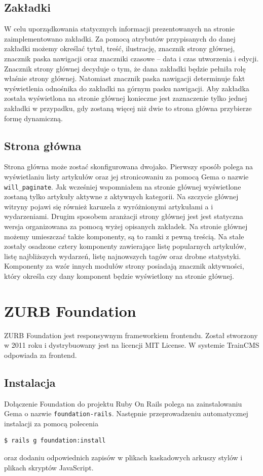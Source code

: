 \documentclass[openright]{xmgr}
\begin{document}
\subsection{Zakładki}
W celu uporządkowania statycznych informacji prezentowanych na stronie zaimplementowano zakładki. Za pomocą atrybutów przypisanych do danej zakładki możemy określać tytuł, treść, ilustrację, znacznik strony głównej, znacznik paska nawigacji oraz znaczniki czasowe – data i czas utworzenia i edycji. Znacznik strony głównej decyduje o tym, że dana zakładki będzie pełniła rolę właśnie strony głównej. Natomiast znacznik paska nawigacji determinuje fakt wyświetlenia odnośnika do zakładki na górnym pasku nawigacji. Aby zakładka została wyświetlona na stronie głównej konieczne jest zaznaczenie tylko jednej zakładki w przypadku, gdy zostaną więcej niż dwie to strona główna przybierze formę dynamiczną.

\subsection{Strona główna}
Strona główna może zostać skonfigurowana dwojako. Pierwszy sposób polega na wyświetlaniu listy artykułów oraz jej stronicowaniu za pomocą Gema o nazwie \texttt{will\_paginate}. Jak wcześniej wspomniałem na stronie głównej wyświetlone zostaną tylko artykuły aktywne z aktywnych kategorii. Na szczycie głównej witryny pojawi się również karuzela z wyróżnionymi artykułami a i wydarzeniami. Drugim sposobem aranżacji strony głównej jest jest statyczna wersja organizowana za pomocą wyżej opisanych zakładek. Na stronie głównej możemy umieszczać także komponenty, są to ramki z pewną treścią. Na stałe zostały osadzone cztery komponenty zawierające listę popularnych artykułów, listę najbliższych wydarzeń, listę najnowszych tagów oraz drobne statystyki. Komponenty za wzór innych modułów strony posiadają znacznik aktywności, który określa czy dany komponent będzie wyświetlony na stronie głównej. 

\newpage

\section{ZURB Foundation}
ZURB Foundation \cite{foundation} jest responsywnym frameworkiem frontendu. Został stworzony w 2011 roku i dystrybuowany jest na licencji MIT License. W systemie \mbox{TrainCMS} odpowiada za frontend. 

\subsection{Instalacja}
Dołączenie Foundation do projektu Ruby On Rails polega na zainstalowaniu Gema o nazwie \texttt{foundation-rails}. Następnie przeprowadzeniu automatycznej instalacji za pomocą polecenia 
\begin{lstlisting}[language=bash, caption={Polecenie instalujące Foundation w naszym projekcie}]
$ rails g foundation:install 
\end{lstlisting} 
oraz dodaniu odpowiednich zapisów w plikach kaskadowych arkuszy stylów i plikach skryptów JavaScript.
\end{document}
